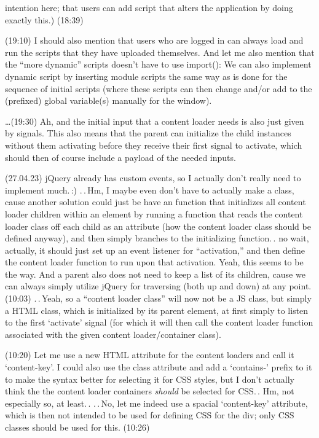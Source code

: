 \documentclass{report}
\begin{document}
intention here; that users can add script that alters the application by doing exactly this.) (18:39)

(19:10) I should also mention that users who are logged in can always load and run the scripts that they have uploaded themselves. And let me also mention that the ``more dynamic'' scripts doesn't have to use import(): We can also implement dynamic script by inserting module scripts the same way as is done for the sequence of initial scripts (where these scripts can then change and/or add to the (prefixed) global variable(s) manually for the window).

\ldots (19:30) Ah, and the initial input that a content loader needs is also just given by signals. This also means that the parent can initialize the child instances without them activating before they receive their first signal to activate, which should then of course include a payload of the needed inputs. 

(27.04.23) jQuery already has custom events, so I actually don't really need to implement much.\,:) .\,.\,Hm, I maybe even don't have to actually make a class, cause another solution could just be have an function that initializes all content loader children within an element by running a function that reads the content loader class off each child as an attribute (how the content loader class should be defined anyway), and then simply branches to the initializing function.\,. no wait, actually, it should just set up an event listener for ``activation,'' and then define the content loader function to run upon that activation. Yeah, this seems to be the way. And a parent also does not need to keep a list of its children, cause we can always simply utilize jQuery for traversing (both up and down) at any point. (10:03) .\,.\,Yeah, so a ``content loader class'' will now not be a JS class, but simply a HTML class, which is initialized by its parent element, at first simply to listen to the first `activate' signal (for which it will then call the content loader function associated with the given content loader/container class).

(10:20) Let me use a new HTML attribute for the content loaders and call it `content-key'. I could also use the class attribute and add a `contains-' prefix to it to make the syntax better for selecting it for CSS styles, but I don't actually think the the content loader containers \emph{should} be selected for CSS.\,. Hm, not especially so, at least.\,. .\,.\,No, let me indeed use a spacial `content-key' attribute, which is then not intended to be used for defining CSS for the div; only CSS classes should be used for this. (10:26)
\end{document}
